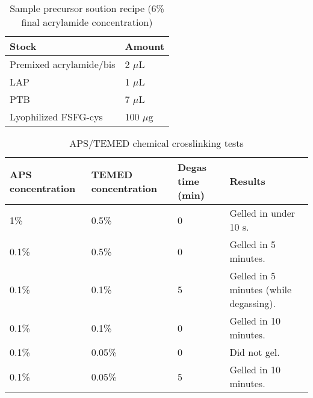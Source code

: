 \begin{table}[b!]
\centering
  \caption[Acrylamide hydrogel recipes.]{Sample precursor soution recipe (6\% final acrylamide concentration)}
    \label{table:acrylamide-recipe}
    \begin{tabular}{p{5cm}p{5cm}}
      Stock & Amount \\
\hline
Premixed acrylamide/bis & 2 $\mu$L \\

LAP & 1 $\mu$L \\

PTB & 7 $\mu$L \\

Lyophilized FSFG-cys & 100 $\mu$g \\
\hline
    \end{tabular}
\end{table}

\begin{table}[t!]
\centering
  \caption[APS/TEMED crosslinking times.]{APS/TEMED chemical crosslinking tests}
    \label{table:APS}
    \begin{tabular}{p{3.5cm}p{4cm}p{2cm}p{5cm}}
      APS concentration & TEMED concentration & Degas time (min) & Results \\
\hline
      1\% & 0.5\% & 0 & Gelled in under 10 s. \\
     0.1\% & 0.5\% & 0 & Gelled in 5 minutes. \\
     0.1\% & 0.1\% & 5 & Gelled in 5 minutes (while degassing). \\
     0.1\% & 0.1\% & 0 & Gelled in 10 minutes. \\
     0.1\% & 0.05\% & 0 & Did not gel. \\
     0.1\% & 0.05\% & 5 & Gelled in 10 minutes. \\
\hline

\hline
    \end{tabular}
\end{table}